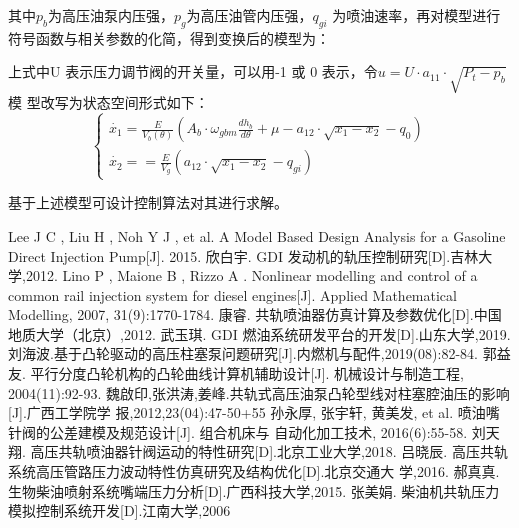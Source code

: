 \documentclass{cumcmthesis}
\begin{document}
其中$p_{b}$为高压油泵内压强，$p_{g}$为高压油管内压强，$q_{gi}$ 为喷油速率，再对模型进行 符号函数与相关参数的化简，得到变换后的模型为： 

上式中U 表示压力调节阀的开关量，可以用-1 或 0 表示，令$u=U\cdot a_{11}\cdot\sqrt{P_{t}-p_{b}}$模 型改写为状态空间形式如下： 
\begin{equation*}
\begin{cases}
\dot{x_{1}}=\frac{E}{V_{b}\left(\theta\right)}\left(A_{b}\cdot\omega_{gbm}\frac{dh_{b}}{d\theta}+\mu-a_{12}\cdot\sqrt{x_{1}-x_{2}}-q_{0}\right)\\
\dot{x_{2}}==\frac{E}{V_{g}}\left(a_{12}\cdot\sqrt{x_{1}-x_{2}}-q_{gi}\right)
\end{cases}
\end{equation*}

基于上述模型可设计控制算法对其进行求解。 
\begin{thebibliography}{20}%
	  Lee J C , Liu H , Noh Y J , et al. A Model Based Design Analysis for a Gasoline Direct Injection Pump[J]. 2015. 
	欣白宇. GDI 发动机的轨压控制研究[D].吉林大学,2012. 
	Lino P , Maione B , Rizzo A . Nonlinear modelling and control of a common rail injection system for diesel engines[J]. Applied Mathematical Modelling, 2007, 31(9):1770-1784.
	康睿. 共轨喷油器仿真计算及参数优化[D].中国地质大学（北京）,2012. 
	武玉琪. GDI 燃油系统研发平台的开发[D].山东大学,2019.
	刘海波.基于凸轮驱动的高压柱塞泵问题研究[J].内燃机与配件,2019(08):82-84. 
	郭益友. 平行分度凸轮机构的凸轮曲线计算机辅助设计[J]. 机械设计与制造工程, 2004(11):92-93.
	 魏啟印,张洪涛,姜峰.共轨式高压油泵凸轮型线对柱塞腔油压的影响[J].广西工学院学 报,2012,23(04):47-50+55 
	孙永厚, 张宇轩, 黄美发, et al. 喷油嘴针阀的公差建模及规范设计[J]. 组合机床与 自动化加工技术, 2016(6):55-58.
	刘天翔. 高压共轨喷油器针阀运动的特性研究[D].北京工业大学,2018.
	吕晓辰. 高压共轨系统高压管路压力波动特性仿真研究及结构优化[D].北京交通大 学,2016.
	郝真真. 生物柴油喷射系统嘴端压力分析[D].广西科技大学,2015.
	张美娟. 柴油机共轨压力模拟控制系统开发[D].江南大学,2006
\end{thebibliography}
\end{document}
